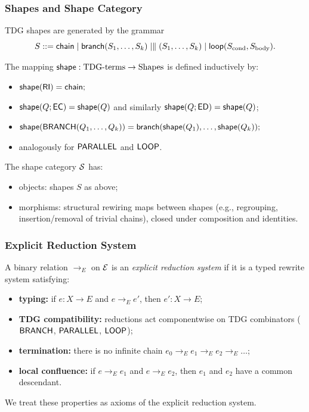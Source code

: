 \subsubsection{Shapes and Shape Category}

\begin{definition}
TDG shapes are generated by the grammar
\[
S ::= \mathsf{chain} \mid
       \mathsf{branch}(S_1,\dots,S_k) \mid
       \parallel(S_1,\dots,S_k) \mid
       \mathsf{loop}(S_{\mathrm{cond}}, S_{\mathrm{body}}).
\]
\end{definition}

\begin{definition}
The mapping
\(\mathsf{shape} : \text{TDG-terms} \to \text{Shapes}\) is defined inductively by:
\begin{itemize}
  \item \(\mathsf{shape}(\mathsf{RI}) = \mathsf{chain};\)
  \item \(\mathsf{shape}(Q;\mathsf{EC}) = \mathsf{shape}(Q)\) and similarly \(\mathsf{shape}(Q;\mathsf{ED}) = \mathsf{shape}(Q)\);
  \item \(\mathsf{shape}(\mathsf{BRANCH}(Q_1,\dots,Q_k))
         = \mathsf{branch}(\mathsf{shape}(Q_1),\dots,\mathsf{shape}(Q_k));\)
  \item analogously for \(\mathsf{PARALLEL}\) and \(\mathsf{LOOP}\).
\end{itemize}
\end{definition}

\begin{definition}
The shape category \(\mathcal{S}\) has:
\begin{itemize}
  \item objects: shapes \(S\) as above;
  \item morphisms: structural rewiring maps between shapes
        (e.g., regrouping, insertion/removal of trivial chains),
        closed under composition and identities.
\end{itemize}
\end{definition}

\subsubsection{Explicit Reduction System}

\begin{definition}
A binary relation \(\to_E\) on \(\mathcal{E}\) is an \emph{explicit reduction system}
if it is a typed rewrite system satisfying:
\begin{itemize}
  \item \textbf{typing:} if \(e : X \to E\) and \(e \to_E e'\), then \(e' : X \to E\);
  \item \textbf{TDG compatibility:} reductions act componentwise on TDG
        combinators (\(\mathsf{BRANCH}\), \(\mathsf{PARALLEL}\), \(\mathsf{LOOP}\));
  \item \textbf{termination:} there is no infinite chain
        \(e_0 \to_E e_1 \to_E e_2 \to_E \dots\);
  \item \textbf{local confluence:} if \(e \to_E e_1\) and \(e \to_E e_2\), then
        \(e_1\) and \(e_2\) have a common descendant.
\end{itemize}
We treat these properties as axioms of the explicit reduction system.
\end{definition}

